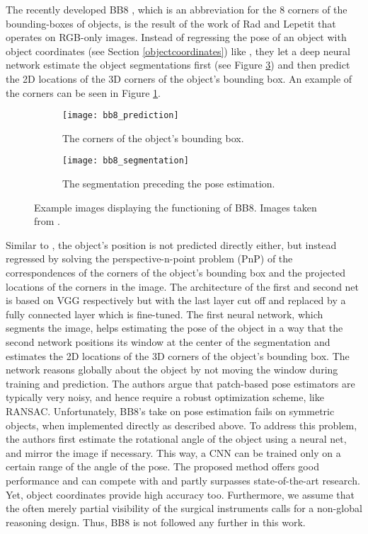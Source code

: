The recently developed BB8 \cite{bb8}, which is an abbreviation for the 8 corners of the bounding-boxes of objects, is the result of the work of Rad and Lepetit that operates on RGB-only images. Instead of regressing the pose of an object with object coordinates (see Section \ref{objectcoordinates}) like \cite{brachmann1}, they let a deep neural network estimate the object segmentations first (see Figure \ref{fig:bb8_segmentation}) and then predict the 2D locations of the 3D corners of the object's bounding box. An example of the corners can be seen in Figure \ref{fig:bb8}.
\nnewline
\begin{figure}[!tbp]
	\centering
	\begin{subfigure}[b]{0.45\textwidth}
		\centering
    	\texttt{[image: bb8\_prediction]}
    	\caption{The corners of the object's bounding box.}
    	\label{fig:bb8}
	\end{subfigure}
	\hfill
	\begin{subfigure}[b]{0.45\textwidth}
		\centering
    	\texttt{[image: bb8\_segmentation]}
    	\caption{The segmentation preceding the pose estimation.}
    	\label{fig:bb8_segmentation}
	\end{subfigure}
	\caption{Example images displaying the functioning of BB8. Images taken from \cite{bb8}.}
\end{figure} 
\noindent
Similar to \cite{brachmann1}, the object's position is not predicted directly either, but instead regressed by solving the perspective-n-point problem (PnP) of the correspondences of the corners of the object's bounding box and the projected locations of the corners in the image. The architecture of the first and second net is based on VGG \cite{vgg} respectively but with the last layer cut off and replaced by a fully connected layer which is fine-tuned. 
\nnewline
The first neural network, which segments the image, helps estimating the pose of the object in a way that the second network positions its window at the center of the segmentation and estimates the 2D locations of the 3D corners of the object's bounding box. The network reasons globally about the object by not moving the window during training and prediction. The authors argue that patch-based pose estimators are typically very noisy, and hence require a robust optimization scheme, like RANSAC. 
\nnewline
Unfortunately, BB8's take on pose estimation fails on symmetric objects, when implemented directly as described above. To address this problem, the authors first estimate the rotational angle of the object using a neural net, and mirror the image if necessary. This way, a CNN can be trained only on a certain range of the angle of the pose.
\nnewline
The proposed method offers good performance and can compete with and partly surpasses state-of-the-art research. Yet, object coordinates provide high accuracy too. Furthermore, we assume that the often merely partial visibility of the surgical instruments calls for a non-global reasoning design. Thus, BB8 is not followed any further in this work.

